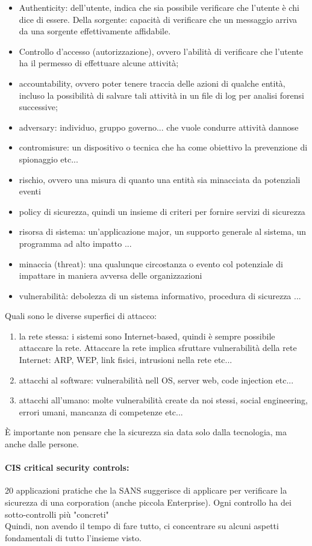 \documentclass[12pt, oneside]{extbook} %
\begin{document}
\begin{itemize}
\item Authenticity: dell'utente, indica che sia possibile verificare che l'utente è chi dice di essere. Della sorgente: capacità di verificare che un messaggio arriva da una sorgente effettivamente affidabile.
\item Controllo d'accesso (autorizzazione), ovvero l'abilità di verificare che l'utente ha il permesso di effettuare alcune attività;
\item accountability, ovvero poter tenere traccia delle azioni di qualche entità, incluso la possibilità di salvare tali attività in un file di log per analisi forensi successive;
\item adversary: individuo, gruppo governo... che vuole condurre attività dannose
\item contromisure: un dispositivo o tecnica che ha come obiettivo la prevenzione di spionaggio etc...
\item rischio, ovvero una misura di quanto una entità sia minacciata da potenziali eventi
\item policy di sicurezza, quindi un insieme di criteri per fornire servizi di sicurezza
\item risorsa di sistema: un'applicazione major, un supporto generale al sistema, un programma ad alto impatto ...
\item minaccia (threat): una qualunque circostanza o evento col potenziale di impattare in maniera avversa delle organizzazioni
\item vulnerabilità: debolezza di un sistema informativo, procedura di sicurezza ...
\end{itemize} 
Quali sono le diverse superfici di attacco:
\begin{enumerate}
\item la rete stessa: i sistemi sono Internet-based, quindi è sempre possibile attaccare la rete. Attaccare la rete implica sfruttare vulnerabilità della rete Internet: ARP, WEP, link fisici, intrusioni nella rete etc...
\item attacchi al software: vulnerabilità nell OS, server web, code injection etc...
\item attacchi all'umano: molte vulnerabilità create da noi stessi, social engineering, errori umani, mancanza di competenze etc...
\end{enumerate}
È importante non pensare che la sicurezza sia data solo dalla tecnologia, ma anche dalle persone.\\ \paragraph{CIS critical security controls:} 20 applicazioni pratiche che la SANS suggerisce di applicare per verificare la sicurezza di una corporation (anche piccola Enterprise). Ogni controllo ha dei sotto-controlli più "concreti"\\ Quindi, non avendo il tempo di fare tutto, ci concentrare su alcuni aspetti fondamentali di tutto l'insieme visto.
\end{document}
